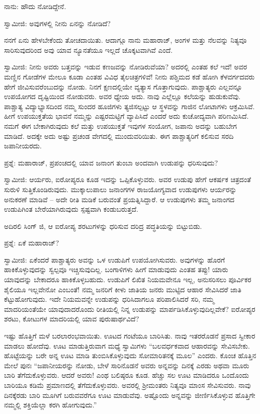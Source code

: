 ನಾನು: ಹೌದು ನೋಡಿದ್ದೇನೆ.

ಸ್ವಾಮೀಜಿ: ಅವುಗಳಲ್ಲಿ ನೀನು ಏನನ್ನು ನೋಡಿದೆ?

ನನಗೆ ಏನು ಹೇಳಬೇಕೆಂದು ತೋಚದಾಯಿತು. ಆದಾಗ್ಗೂ ನಾನು ಮಹಾರಾಜ್, ಅಂಗಳ ಮತ್ತು ನೆಲವನ್ನು ನಿತ್ಯವೂ ಸಾರಿಸುವುದರಿಂದ ಅವು ಯಾವ ನ್ಯೂನತೆಯೂ ಇಲ್ಲದೆ ಚೊಕ್ಕಟವಾಗಿವೆ ಎಂದೆ.

ಸ್ವಾಮೀಜಿ: ನೀನು ಅವರು ಬತ್ತವನ್ನು ಇಡುವ ಕಣಜವನ್ನು ನೋಡಿರುವೆಯಾ? ಅದರಲ್ಲಿ ಎಂತಹ ಕಲೆ ಇದೆ! ಅವರ ಮಣ್ಣಿನ ಗೋಡೆಗಳ ಮೇಲೂ ಕೂಡಾ ಎಂತಹ ವಿವಿಧ ತೈಲಚಿತ್ರಗಳಿವೆ! ನೀನು ಪಶ್ಚಿಮದ ಕಡೆ ಹೋಗಿ ಕೆಳವರ್ಗದವರು ಹೇಗೆ ಜೀವಿಸುವರೆಂಬುದನ್ನು ನೋಡು. ನಿನಗೆ ಕ್ಷಣದಲ್ಲಿಯೇ ವ್ಯತ್ಯಾಸ ಗೊತ್ತಾಗುವುದು. ಪಾಶ್ಚಾತ್ಯರು ಎಲ್ಲವನ್ನೂ ಉಪಯೋಗದ ದೃಷ್ಟಿಯಿಂದ ನೋಡುವರು. ಅವರ ಧ್ಯೇಯ ಅದು. ನಾವು ಎಲ್ಲೆಲ್ಲೂ ಕಲೆಯನ್ನು ಹುಡುಕುವೆವು. ಪಾಶ್ಚಾತ್ಯ ವಿದ್ಯಾಭ್ಯಾಸದಿಂದ ನಮ್ಮ ಸುಂದರ ಹೂಜಿಗಳು ತ್ಯಜಿಸಲ್ಪಟ್ಟು ಆ ಸ್ಥಳವನ್ನು ಗಾಜಿನ ಲೋಟಾಗಳು ಆಕ್ರಮಿಸಿವೆ. ಹೀಗೆ ಉಪಯುಕ್ತತೆಯ ಭಾವನೆ ನಮ್ಮನ್ನು ಎಷ್ಟರಮಟ್ಟಿಗೆ ವ್ಯಾಪಿಸಿದೆ ಎಂದರೆ ಅದು ಕುಚೋದ್ಯವಾಗಿ ಪರಿಣಮಿಸಿದೆ. ನಮಗೆ ಈಗ ಬೇಕಾಗಿರುವುದು ಕಲೆ ಮತ್ತು ಉಪಯುಕ್ತತೆ ಇವುಗಳ ಸಂಯೋಗ, ಜಪಾನು ಅದನ್ನು ಬಹುಬೇಗ ಮಾಡಿದೆ. ಅದಕ್ಕೇ ಅದು ಅಷ್ಟು ಪ್ರಚಂಡ ವೇಗದಲ್ಲಿ ಮುಂದುವರಿಯಿತು. ಈಗ ಪಾಶ್ಚಾತ್ಯರಿಗೆ ಕಲಿಸುವ ಸರದಿ ಜಪಾನೀಯರದು.

ಪ್ರಶ್ನೆ: ಮಹಾರಾಜ್, ಪ್ರಪಂಚದಲ್ಲಿ ಯಾವ ಜನಾಂಗ ತುಂಬಾ ಅಂದವಾಗಿ ಉಡುಪನ್ನು ಧರಿಸುವುದು?

ಸ್ವಾಮೀಜಿ: ಆರ್ಯರು, ಐರೋಪ್ಯರೂ ಕೂಡ ಇದನ್ನು ಒಪ್ಪಿಕೊಳ್ಳುವರು. ಅವರ ಉಡುಪು ಹೇಗೆ ಆಕರ್ಷಕ ಚಿತ್ರದಂತೆ ಸುರುಳಿ ಸುತ್ತಿಕೊಂಡಿರುವುದು. ಮುಕ್ಕಾಲುಪಾಲು ಜನಾಂಗಗಳ ರಾಜಯೋಗ್ಯವಾದ ಉಡುಪುಗಳು ಆರ್ಯರನ್ನು ಅನುಕರಣೆ ಮಾಡಿವೆ – ಅದೇ ರೀತಿ ಮಡಿಕೆ ಬರುವಂತೆ ಪ್ರಯತ್ನಿಸಿದ್ದಾರೆ. ಆ ಉಡುಪುಗಳು ತಮ್ಮ ಜನಾಂಗದ ಉಡುಪಿಗಿಂತ ಬೇರೆಯಾಗಿರುವುದು ಸ್ಪಷ್ಟವಾಗಿ ಕಂಡುಬರುತ್ತದೆ.

ಅದಿರಲಿ ಸಿಂಗ್ ಜಿ, ಆ ಐರೋಪ್ಯ ಶರಟುಗಳನ್ನು ಧರಿಸುವ ದರಿದ್ರ ಪದ್ಧತಿಯನ್ನು ಬಿಟ್ಟುಬಿಡು.

ಪ್ರಶ್ನೆ: ಏಕೆ ಮಹಾರಾಜ್?

ಸ್ವಾಮೀಜಿ: ಏಕೆಂದರೆ ಪಾಶ್ಚಾತ್ಯರು ಅವನ್ನು ಒಳ ಉಡುಪಿಗೆ ಉಪಯೋಗಿಸುವರು. ಅವುಗಳನ್ನು ಹೊರಗೆ ಹಾಕಿಕೊಳ್ಳುವುದನ್ನು ಸ್ವಲ್ಪವೂ ಇಚ್ಚಿಸುವುದಿಲ್ಲ. ಬಂಗಾಳಿಗಳು ಹೀಗೆ ಮಾಡುವುದು ಎಂತಹ ತಪ್ಪು! ಯಾರು ಯಾವುದನ್ನು ಬೇಕಾದರೂ ಹಾಕಿಕೊಳ್ಳಬಹುದು. ಉಡುಪಿಗೆ ಲಿಖಿತ ನಿಯಮವೇನೂ ಇಲ್ಲ, ಅನುಸರಿಸಲು ಪೂರ್ವಿಕರ ಶೈಲಿಯೂ ಇಲ್ಲವೇನೋ ಎಂಬಂತೆ! ನಮ್ಮ ಜನರಿಗೆ ಕೀಳು ಜಾತಿಯ ಜನರು ಮುಟ್ಟಿದ ಆಹಾರ ಸೇವಿಸಿದರೆ ಜಾತಿ ಕೆಟ್ಟುಹೋಗುವುದು. ಇದೇ ನಿಯಮವನ್ನೇ ಉಡುಪನ್ನು ಧರಿಸಿದಾಗಲೂ ಪರಿಪಾಲಿಸಿದರೆ ಸರಿ, ನಮ್ಮ ಮಾದರಿಯಂತೆಯೇ ಯಾವುದಾದರೊಂದು ರೀತಿಯಲ್ಲಿ ನಿನ್ನ ಉಡುಪನ್ನು ಮಾರ್ಪಡಿಸಿಕೊಳ್ಳುವುದಿಲ್ಲವೇಕೆ? ಐರೋಪ್ಯರ ಶರಟು, ಕೋಟುಗಳ ಮಾದರಿಯಲ್ಲಿ ಯಾವ ಪುರುಷಾರ್ಥವಿದೆ?

ಇಷ್ಟು ಹೊತ್ತಿಗೆ ಮಳೆ ಬರಲಾರಂಭವಾಯಿತು. ಊಟದ ಗಂಟೆಯೂ ಬಾರಿಸಿತು. ನಾವು ಇತರರೊಡನೆ ಪ್ರಸಾದ ಸ್ವೀಕಾರ ಮಾಡಲು ಹೋದೆವು. ಊಟ ಮಾಡುತ್ತಿರುವಾಗ ಮಧ್ಯೆ ಸ್ವಾಮಿಗಳು “ಬಲವರ್ಧಕವಾದ ಆಹಾರವನ್ನು ಸೇವಿಸಬೇಕು. ಹೊಟ್ಟೆಯನ್ನು ಬರೇ ಅನ್ನ ಊಟ ಮಾಡಿ ತುಂಬಿಸಿಕೊಳ್ಳುವುದು ಸೋಮಾರಿತನಕ್ಕೆ ಮೂಲ” ಎಂದರು. ಕೊಂಚ ಹೊತ್ತಿನ ಮೇಲೆ ಪುನಃ “ಜಪಾನೀಯರನ್ನು ನೋಡು, ಬೇಳೆ ಸಾರಿನೊಡನೆ ಅವರು ಅನ್ನವನ್ನು ದಿನಕ್ಕೆ ಎರಡು ಅಥವಾ ಮೂರು ಬಾರಿ ತೆಗೆದುಕೊಳ್ಳುವರು. ಆದರೆ ಅವರು! ಎಂಥ ಬಲಿಷ್ಠರೂ ಕೂಡ. ಹೆಚ್ಚು ಸಲ ಊಟ ಮಾಡಿದರೂ ಒಂದೊಂದು ಬಾರಿಯೂ ಕಡಿಮೆ ಪ್ರಮಾಣದಲ್ಲಿ ತೆಗೆದುಕೊಳ್ಳುವರು. ಅವರಲ್ಲಿ ಶ‍್ರೀಮಂತರು ನಿತ್ಯವೂ ಮಾಂಸ ಸೇವಿಸುವರು. ನಾವು ದಿನಕ್ಕೆರಡು ಬಾರಿ ಮೂಗಿಗೆ ಬರುವವರೆಗೂ ಊಟ ಮಾಡುವೆವು. ಅಷ್ಟೊಂದು ಅನ್ನವನ್ನು ಜೀರ್ಣಿಸಿಕೊಳ್ಳುವ ಹೊತ್ತಿಗೇ ನಮ್ಮಲ್ಲಿ ಶಕ್ತಿಯೆಲ್ಲಾ ಕರಗಿ ಹೋಗುವುದು.”

